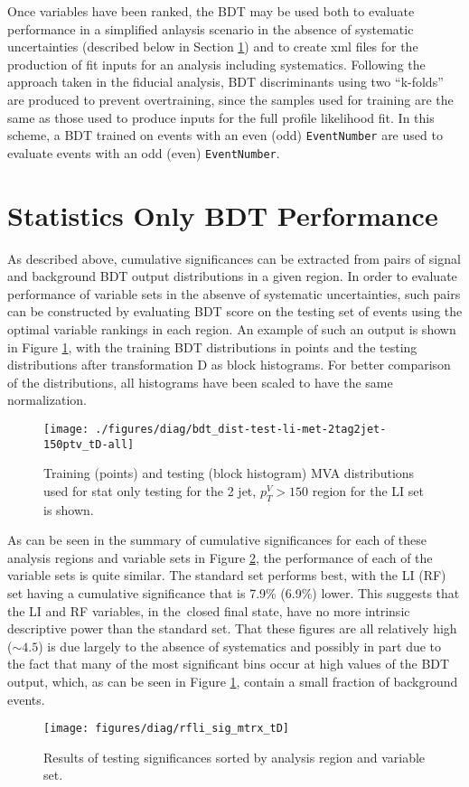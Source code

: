 Once variables have been ranked, the BDT may be used both to evaluate performance in a simplified anlaysis scenario in the absence of systematic uncertainties (described below in Section \ref{subsec:statonlyperf}) and to create xml files for the production of fit inputs for an analysis including systematics.  Following the approach taken in the fiducial analysis, BDT discriminants using two ``k-folds'' are produced to prevent overtraining, since the samples used for training are the same as those used to produce inputs for the full profile likelihood fit.  In this scheme, a BDT trained on events with an even (odd) \texttt{EventNumber} are used to evaluate events with an odd (even) \texttt{EventNumber}.

\section{Statistics Only BDT Performance}
\label{subsec:statonlyperf}
As described above, cumulative significances can be extracted from pairs of signal and background BDT output distributions in a given region.  In order to evaluate performance of variable sets in the absenve of systematic uncertainties, such pairs can be constructed by evaluating BDT score on the testing set of events using the optimal variable rankings in each region.  An example of such an output is shown in Figure \ref{fig:testingexample}, with the training BDT distributions in points and the testing distributions after transformation D as block histograms.  For better comparison of the distributions, all histograms have been scaled to have the same normalization.

\begin{figure}[!htbp]\captionsetup{justification=centering}
  \centering
  \texttt{[image: ./figures/diag/bdt\_dist-test-li-met-2tag2jet-150ptv\_tD-all]}
  \caption{Training (points) and testing (block histogram) MVA distributions used for stat only testing for the 2 jet, $p_T^V>150$ \GeV region for the LI set is shown.}
  \label{fig:testingexample}
\end{figure}

As can be seen in the summary of cumulative significances for each of these analysis regions and variable sets in Figure \ref{fig:statonlysob}, the performance of each of the variable sets is quite similar.  The standard set performs best, with the LI (RF) set having a cumulative significance that is 7.9\% (6.9\%) lower.  This suggests that the LI and RF variables, in the \ZH\,closed final state, have no more intrinsic descriptive power than the standard set.  That these figures are all relatively high ($\sim4.5$) is due largely to the absence of systematics and possibly in part due to the fact that many of the most significant bins occur at high values of the BDT output, which, as can be seen in Figure \ref{fig:testingexample}, contain a small fraction of background events.  
\begin{figure}[!htbp]\captionsetup{justification=centering}
  \centering
  \texttt{[image: figures/diag/rfli\_sig\_mtrx\_tD]}
  \caption{Results of testing significances sorted by analysis region and variable set.}
  \label{fig:statonlysob}
\end{figure}

